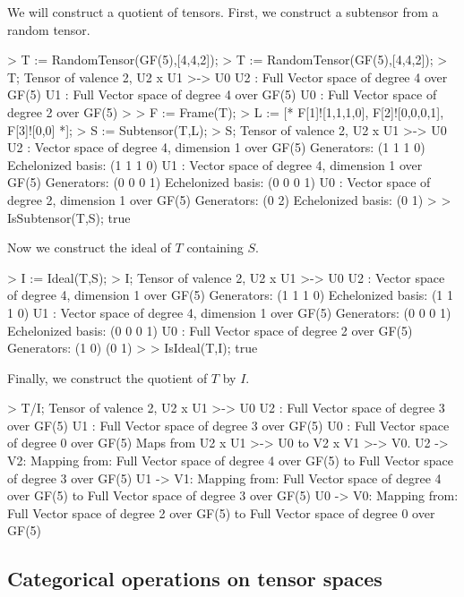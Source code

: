 \begin{example}
We will construct a quotient of tensors. First, we construct a subtensor from a random tensor.

\begin{code}
> T := RandomTensor(GF(5),[4,4,2]);
> T := RandomTensor(GF(5),[4,4,2]);
> T;
Tensor of valence 2, U2 x U1 >-> U0
U2 : Full Vector space of degree 4 over GF(5)
U1 : Full Vector space of degree 4 over GF(5)
U0 : Full Vector space of degree 2 over GF(5)
> 
> F := Frame(T);
> L := [* F[1]![1,1,1,0], F[2]![0,0,0,1], F[3]![0,0] *];
> S := Subtensor(T,L);
> S;
Tensor of valence 2, U2 x U1 >-> U0
U2 : Vector space of degree 4, dimension 1 over GF(5)
Generators:
(1 1 1 0)
Echelonized basis:
(1 1 1 0)
U1 : Vector space of degree 4, dimension 1 over GF(5)
Generators:
(0 0 0 1)
Echelonized basis:
(0 0 0 1)
U0 : Vector space of degree 2, dimension 1 over GF(5)
Generators:
(0 2)
Echelonized basis:
(0 1)
> 
> IsSubtensor(T,S);
true
\end{code}

Now we construct the ideal of $T$ containing $S$.

\begin{code}
> I := Ideal(T,S);
> I;
Tensor of valence 2, U2 x U1 >-> U0
U2 : Vector space of degree 4, dimension 1 over GF(5)
Generators:
(1 1 1 0)
Echelonized basis:
(1 1 1 0)
U1 : Vector space of degree 4, dimension 1 over GF(5)
Generators:
(0 0 0 1)
Echelonized basis:
(0 0 0 1)
U0 : Full Vector space of degree 2 over GF(5)
Generators:
(1 0)
(0 1)
> 
> IsIdeal(T,I);
true
\end{code}

Finally, we construct the quotient of $T$ by $I$.

\begin{code}
> T/I;
Tensor of valence 2, U2 x U1 >-> U0
U2 : Full Vector space of degree 3 over GF(5)
U1 : Full Vector space of degree 3 over GF(5)
U0 : Full Vector space of degree 0 over GF(5)
Maps from U2 x U1 >-> U0 to V2 x V1 >-> V0.
U2 -> V2: Mapping from: Full Vector space of degree 4 over 
GF(5) to Full Vector space of degree 3 over GF(5)
U1 -> V1: Mapping from: Full Vector space of degree 4 over 
GF(5) to Full Vector space of degree 3 over GF(5)
U0 -> V0: Mapping from: Full Vector space of degree 2 over 
GF(5) to Full Vector space of degree 0 over GF(5)
\end{code}
\end{example}

\subsection{Categorical operations on tensor spaces}

